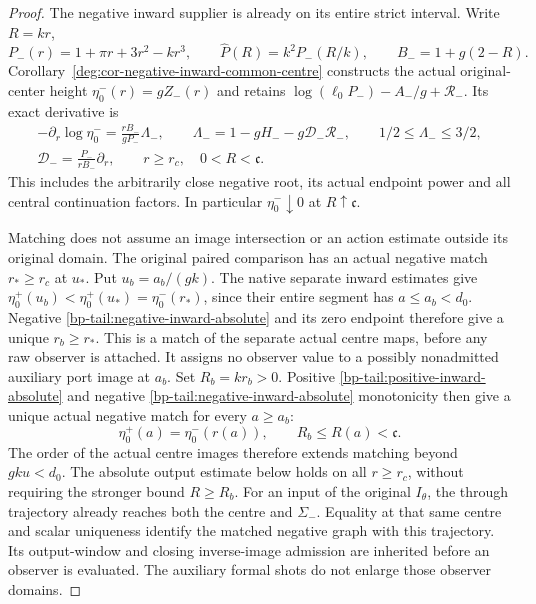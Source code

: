 \begin{proof}
The negative inward supplier is already on its entire strict interval.
Write \(R=kr\),
\[
 P_-(r)=1+\pi r+3r^2-kr^3,\qquad
 \widehat P(R)=k^2P_-(R/k),\qquad B_-=1+g(2-R).
\]
Corollary~\ref{deg:cor-negative-inward-common-centre} constructs the
actual original-center height \(\eta_0^-(r)=gZ_-(r)\) and retains
\(\log(\ell_0P_-)-A_-/g+\mathcal R_-\). Its exact derivative is
\begin{equation}\label{bp-tail:negative-inward-absolute}
 \begin{gathered}
 -\partial_r\log\eta_0^-=\frac{rB_-}{gP_-}\Lambda_-,\qquad
 \Lambda_-=1-gH_--g\mathcal D_-\mathcal R_-,\qquad
                         1/2\le\Lambda_-\le3/2,\\
 \mathcal D_-=\frac{P_-}{rB_-}\partial_r,\qquad
 r\ge r_c,\quad 0<R<\mathfrak c.
 \end{gathered}
\end{equation}
This includes the arbitrarily close negative root, its actual endpoint
power and all central continuation factors. In particular
\(\eta_0^-\downarrow0\) at \(R\uparrow\mathfrak c\).

Matching does not assume an image intersection or an action estimate
outside its original domain. The original paired comparison has an
actual negative match \(r_*\ge r_c\) at \(u_*\).
Put \(u_b=a_b/(gk)\). The native separate inward estimates give
\(\eta_0^+(u_b)<\eta_0^+(u_*)=\eta_0^-(r_*)\), since their entire
segment has \(a\le a_b<d_0\). Negative
\eqref{bp-tail:negative-inward-absolute} and its zero endpoint
therefore give a unique \(r_b\ge r_*\). This is a match of the
separate actual centre maps, before any raw observer is attached.
It assigns no observer value to a possibly nonadmitted auxiliary
port image at \(a_b\). Set \(R_b=kr_b>0\).
Positive \eqref{bp-tail:positive-inward-absolute}
and negative \eqref{bp-tail:negative-inward-absolute} monotonicity then
give a unique actual negative match for every \(a\ge a_b\):
\begin{equation}\label{bp-tail:whole-tail-matching}
 \eta_0^+(a)=\eta_0^-(r(a)),\qquad R_b\le R(a)<\mathfrak c.
\end{equation}
The order of the actual centre images therefore extends matching beyond
\(gku<d_0\). The absolute output estimate below holds on all
\(r\ge r_c\), without requiring the stronger bound \(R\ge R_b\).
For an input of the original \(I_\theta\), the through trajectory
already reaches both the centre and \(\Sigma_-\). Equality at that
same centre and scalar uniqueness identify the matched negative graph
with this trajectory. Its output-window and closing inverse-image
admission are inherited before an observer is evaluated. The auxiliary
formal shots do not enlarge those observer domains.


\end{proof}
